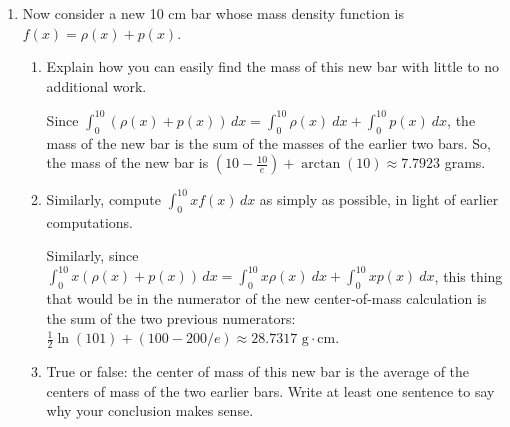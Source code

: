 \begin{enumerate}[leftmargin=0pt]
\begin{enumerate}
\begin{red}
    The center of mass of bar $p$ is
    \begin{align*}
        \frac{\int_0^{10}x\cdot e^{-0.1x}\, dx}{\int_0^{10} e^{-0.1x}\, dx} &= \frac{1}{10-10/e}\int_0^{10} x e^{-0.1x}\, dx \quad \text{(integration by parts)} \\
        &= \frac{1}{10-10/e}\left[-10xe^{-0.1x} - 100e^{-0.1x}\right|_0^{10} \\
        &= \frac{1}{10-10/e}
            [(-10\cdot 10 \cdot e^{-1} - 
            100\cdot e^{-1})-
            (-10\cdot 0 \cdot e^0 - 100e^0)] \\
        &= \frac{1}{10-10/e}\left[\frac{-100}{e} - \frac{100}{e} + 0 + 100\right] 
        = \frac{100 - 200/e}{10 - 10/e} \approx 4.1802\text{ cm}
    \end{align*}
    \end{red}
    \item Now consider a new 10 cm bar whose mass density function is $f(x) = \rho(x) + p(x)$.
    \begin{enumerate}
        \item Explain how you can easily find the mass of this new bar with little to no additional work.
        
        \begin{red}
        Since $\int_0^{10} (\rho(x) + p(x))\, dx = \int_0^{10} \rho(x)\ dx + \int_0^{10}p(x)\ dx$, the mass of the new bar is the sum of the masses of the earlier two bars. So, the mass of the new bar is $ \left(10 - \frac{10}{e}\right) + \arctan(10) \approx 7.7923$ grams.
        \end{red}
        \item Similarly, compute $\int_0^{10} x f(x)\, dx$ as simply as possible, in light of earlier computations.
        
        \begin{red}
        Similarly, since $\int_0^{10} x(\rho(x) + p(x))\, dx = \int_0^{10} x\rho(x)\ dx + \int_0^{10} x p(x)\ dx$, this thing that would be in the numerator of the new center-of-mass calculation is the sum of the two previous numerators: \\
        $\tfrac{1}{2} \ln(101) + (100 - 200/e) \approx 28.7317\text{ g} \cdot\text{cm}.$
        \end{red}
        \item True or false: the center of mass of this new bar is the average of the centers of mass of the two earlier bars. Write at least one sentence to say why your conclusion makes sense.
        

\end{enumerate}
\end{enumerate}
\end{enumerate}
